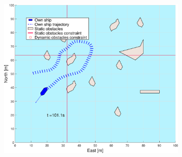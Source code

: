 \begin{figure}[!ht] %
    \begin{subfigure}[b]{0.494\textwidth}
        \centering
        \includegraphics[width=\textwidth]{Images/Figures/skjergard_u_trafikk/_Simple_0fig1_time=101}

\end{subfigure}
\end{figure}
